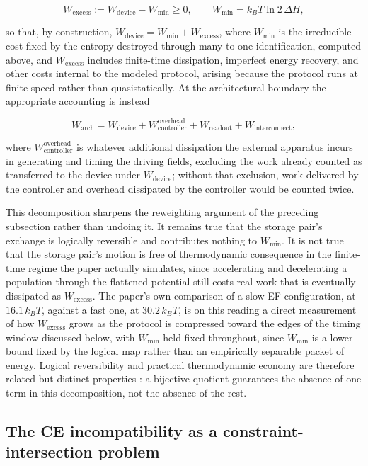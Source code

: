 \documentclass[11pt]{article}
\begin{document}
\[
W_{\mathrm{excess}} := W_{\mathrm{device}} - W_{\min} \ge 0, \qquad W_{\min} = k_BT\ln2\,\Delta H,
\]

so that, by construction, $W_{\mathrm{device}} = W_{\min} + W_{\mathrm{excess}}$, where $W_{\min}$ is the irreducible cost fixed by the entropy destroyed through many-to-one identification, computed above, and $W_{\mathrm{excess}}$ includes finite-time dissipation, imperfect energy recovery, and other costs internal to the modeled protocol, arising because the protocol runs at finite speed rather than quasistatically. At the architectural boundary the appropriate accounting is instead

\[
W_{\mathrm{arch}} = W_{\mathrm{device}} + W_{\mathrm{controller}}^{\mathrm{overhead}} + W_{\mathrm{readout}} + W_{\mathrm{interconnect}},
\]

where $W_{\mathrm{controller}}^{\mathrm{overhead}}$ is whatever additional dissipation the external apparatus incurs in generating and timing the driving fields, excluding the work already counted as transferred to the device under $W_{\mathrm{device}}$; without that exclusion, work delivered by the controller and overhead dissipated by the controller would be counted twice.

This decomposition sharpens the reweighting argument of the preceding subsection rather than undoing it. It remains true that the storage pair's exchange is logically reversible and contributes nothing to $W_{\min}$. It is not true that the storage pair's motion is free of thermodynamic consequence in the finite-time regime the paper actually simulates, since accelerating and decelerating a population through the flattened potential still costs real work that is eventually dissipated as $W_{\mathrm{excess}}$. The paper's own comparison of a slow EF configuration, at $16.1\,k_BT$, against a fast one, at $30.2\,k_BT$, is on this reading a direct measurement of how $W_{\mathrm{excess}}$ grows as the protocol is compressed toward the edges of the timing window discussed below, with $W_{\min}$ held fixed throughout, since $W_{\min}$ is a lower bound fixed by the logical map rather than an empirically separable packet of energy. Logical reversibility and practical thermodynamic economy are therefore related but distinct properties \cite{Likharev1982,TakeuchiYamanashiYoshikawa2015}: a bijective quotient guarantees the absence of one term in this decomposition, not the absence of the rest.

\subsection{The CE incompatibility as a constraint-intersection problem}
\end{document}
